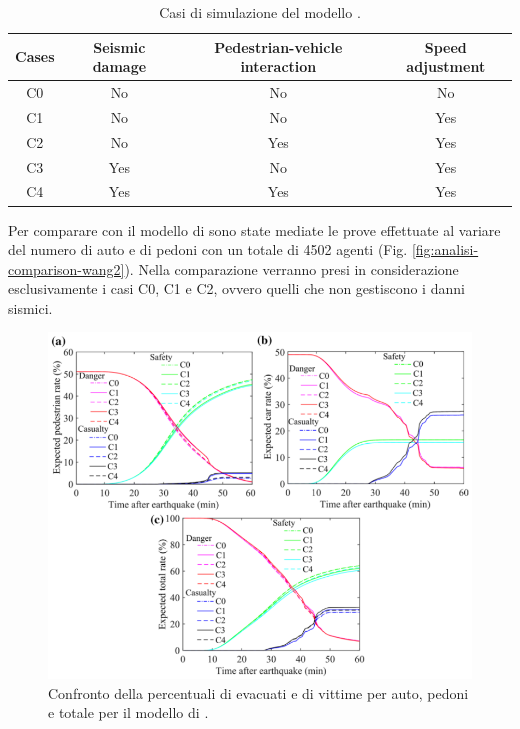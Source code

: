 \begin{table}[ht]
    \centering
    \begin{tabular}{|c|c|c|c|}
    \hline
    Cases & Seismic damage & Pedestrian-vehicle interaction & Speed adjustment \\ \hline
    C0 & No  & No  & No  \\ \hline
    C1 & No  & No  & Yes \\ \hline
    C2 & No  & Yes & Yes \\ \hline
    C3 & Yes & No  & Yes \\ \hline
    C4 & Yes & Yes & Yes \\ \hline
    \end{tabular}
    \caption{Casi di simulazione del modello \textcite{wang2021novel}.}
    \label{tab:cases}
\end{table}

Per comparare con il modello di \textcite{wang2021novel} sono state mediate le prove effettuate al variare del numero
di auto e di pedoni con un totale di 4502 agenti (Fig. \ref{fig:analisi-comparison-wang2}).
Nella comparazione verranno presi in considerazione esclusivamente i casi C0, C1 e C2, ovvero quelli
che non gestiscono i danni sismici.

\begin{figure}[ht]
    \centering
    \includegraphics[width=\textwidth]{images/analisi/WANG_comparison1.png}
    \caption{Confronto della percentuali di evacuati e di vittime per auto, pedoni e totale per il modello di \textcite{wang2021novel}.}
    \label{fig:analisi-comparison-wang1}
\end{figure}

